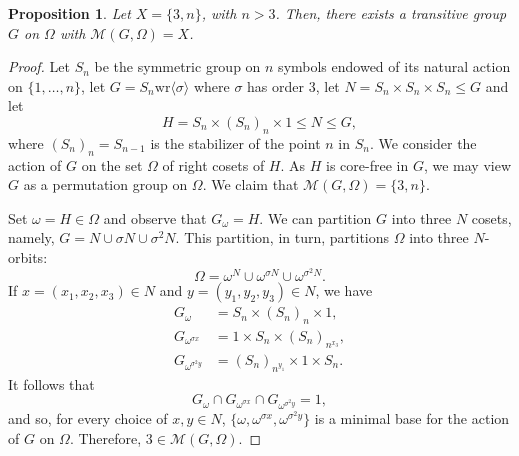 \documentclass{amsart}
\newtheorem{proposition}[theorem]{Proposition}
\begin{document}
	\begin{proposition}\label{number prop}
	Let $X = \{3,n\}$, with $n>3$. Then, there exists a transitive group $G$ on $\Omega$ with $\mathcal{M}(G,\Omega) = X$.
	\end{proposition}
	\begin{proof}
Let $S_n$ be the symmetric group on $n$ symbols endowed of its natural action on $\{1,\ldots,n\}$, let $G=S_{n} \mathrm{wr} \langle\sigma\rangle$ where $\sigma$ has order $3$, let $N = S_n \times S_n \times S_n \leq G$ and let
		\[
			H = S_{n} \times (S_{n})_n \times 1 \leq N \leq G,
		\] 
		where $(S_{n})_n = S_{n-1}$ is the stabilizer of the  point $n$ in $S_{n}$. We consider the action of $G$ on the set $\Omega$ of right cosets of $H$.  As $H$ is core-free in $G$, we may view $G$ as a permutation group on $\Omega$. We claim that $\mathcal{M}(G,\Omega)=\{3,n\}$.
		
		
		
Set $\omega=H\in \Omega$ and observe  that $G_\omega = H$. We can partition $G$ into three $N$ cosets, namely, $G = N \cup \sigma N \cup \sigma^2 N.$ This partition, in turn, partitions $\Omega$ into three $N$-orbits:
$$\Omega=\omega^N\cup\omega^{\sigma N}\cup\omega^{\sigma^2N}.$$ If $x = (x_1,x_2,x_3) \in N$ and $ y = (y_1,y_2,y_3) \in N$, we have
		\begin{align}\label{tue0}
			G_\omega &= S_{n} \times (S_{n})_n \times 1, \\\nonumber
			G_{\omega^{\sigma x}} & =1 \times S_{n} \times (S_{n})_{n^{x_3}}, \\\nonumber
			G_{\omega^{\sigma^2 y}} &= (S_{n})_{n^{y_1}} \times 1 \times S_{n}.
		\end{align}
		It follows that
		\[
			G_\omega \cap G_{\omega^{\sigma x}} \cap G_{\omega^{\sigma^2 y}} = 1,
		\]
		and so, for every choice of $x,y \in N$, $\{ \omega, \omega^{\sigma x}, \omega^{\sigma^2 y}\}$ is a minimal base for the action of $G$ on $\Omega$. Therefore, $3\in \mathcal{M}(G,\Omega)$.
		

\end{proof}
\end{document}
